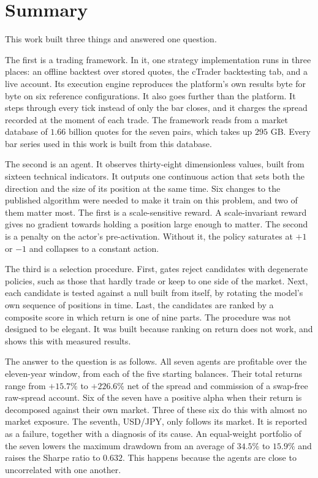 \section{Summary}
\label{Section:Summary}

This work built three things and answered one question.

The first is a trading framework. In it, one strategy implementation runs in three places: an offline backtest over stored quotes, the cTrader backtesting tab, and a live account. Its execution engine reproduces the platform's own results byte for byte on six reference configurations. It also goes further than the platform. It steps through every tick instead of only the bar closes, and it charges the spread recorded at the moment of each trade. The framework reads from a market database of $1.66$ billion quotes for the seven pairs, which takes up $295$ GB. Every bar series used in this work is built from this database.

The second is an agent. It observes thirty-eight dimensionless values, built from sixteen technical indicators. It outputs one continuous action that sets both the direction and the size of its position at the same time. Six changes to the published algorithm were needed to make it train on this problem, and two of them matter most. The first is a scale-sensitive reward. A scale-invariant reward gives no gradient towards holding a position large enough to matter. The second is a penalty on the actor's pre-activation. Without it, the policy saturates at $+1$ or $-1$ and collapses to a constant action.

The third is a selection procedure. First, gates reject candidates with degenerate policies, such as those that hardly trade or keep to one side of the market. Next, each candidate is tested against a null built from itself, by rotating the model's own sequence of positions in time. Last, the candidates are ranked by a composite score in which return is one of nine parts. The procedure was not designed to be elegant. It was built because ranking on return does not work, and  shows this with measured results.

The answer to the question is as follows. All seven agents are profitable over the eleven-year window, from each of the five starting balances. Their total returns range from $+15.7\%$ to $+226.6\%$ net of the spread and commission of a swap-free raw-spread account. Six of the seven have a positive alpha when their return is decomposed against their own market. Three of these six do this with almost no market exposure. The seventh, USD/JPY, only follows its market. It is reported as a failure, together with a diagnosis of its cause. An equal-weight portfolio of the seven lowers the maximum drawdown from an average of $34.5\%$ to $15.9\%$ and raises the Sharpe ratio to $0.632$. This happens because the agents are close to uncorrelated with one another.

